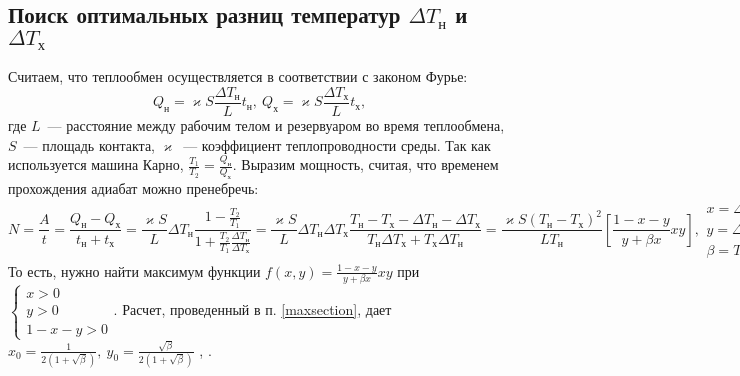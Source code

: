 \documentclass[a4paper]{article}
\begin{document}
\subsection{Поиск оптимальных разниц температур $\Delta T_\text{н}$ и $\Delta T_\text{х}$}
Считаем, что теплообмен осуществляется в соответствии с законом Фурье:
$$
Q_\text{н}=\varkappa S\frac{\Delta T_{\text{н}}}{L}t_{\text{н}},\ 
Q_\text{х}=\varkappa S\frac{\Delta T_{\text{х}}}{L}t_{\text{х}},
$$
где $L$~--- расстояние между рабочим телом и резервуаром во время теплообмена, $S$~--- площадь контакта, $\varkappa$~--- коэффициент теплопроводности среды.\newline
Так как используется машина Карно, $\frac{T_1}{T_2}=\frac{Q_{\text{н}}}{Q_{\text{х}}}$.\newline
Выразим мощность, считая, что временем прохождения адиабат можно пренебречь:
$$
N=\frac{A}{t}=\frac{Q_\text{н}-Q_\text{х}}{t_{\text{н}}+t_{\text{х}}}=
\frac{\varkappa S}{L}\Delta T_{\text{н}}\frac{1-\frac{T_2}{T_1}}{1+\frac{T_2}{T_1}\frac{\Delta T_{\text{н}}}{\Delta T_{\text{х}}}}=
\frac{\varkappa S}{L}\Delta T_{\text{н}}\Delta T_{\text{х}}\frac{T_{\text{н}}-T_{\text{х}}-\Delta T_{\text{н}}-\Delta T_{\text{х}}}{T_{\text{н}}\Delta T_{\text{х}}+T_{\text{х}}\Delta T_{\text{н}}}=
\frac{\varkappa S(T_{\text{н}}-T_{\text{х}})^2}{LT_{\text{н}}}\left[\frac{1-x-y}{y+\beta x}xy\right],
\begin{array}{lcr}
x=\Delta T_{\text{н}}/(T_{\text{н}}-T_{\text{х}}),\\
y=\Delta T_{\text{х}}/(T_{\text{н}}-T_{\text{х}}),\\
\beta= T_{\text{х}}/T_{\text{н}}
\end{array}
$$
То есть, нужно найти максимум функции $f(x,y)=\frac{1-x-y}{y+\beta x}xy$ при $\left\{
\begin{array}{lcr}
x>0\\
y>0\\
1-x-y>0
\end{array}
\right.$.\newline
Расчет, проведенный в п. \ref{maxsection}, дает
$x_0=\frac{1}{2(1+\sqrt{\beta})},\ y_0=\frac{\sqrt{\beta}}{2(1+\sqrt{\beta})}$\newline
\fbox{$\eta=1-\sqrt{\frac{T_{\text{х}}}{T_{\text{н}}}}$},
.
\newpage
\end{document}
